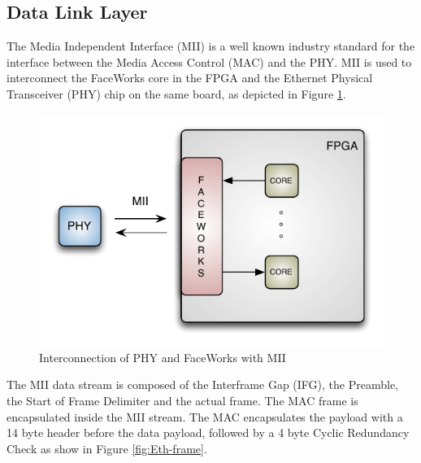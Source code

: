 \documentclass[conference]{IEEEtran}
\begin{document}
\subsection{Data Link Layer}

The Media Independent Interface (MII)\cite{ieee802.3b} is a well known industry standard for the interface between the Media Access Control (MAC)\cite{ieee802.3a} and the PHY. MII is used to interconnect the FaceWorks core in the FPGA and the Ethernet Physical Transceiver (PHY) chip on the same board, as depicted in Figure \ref{fig:MII}.

\begin{figure}[h]
  \centering
      \includegraphics[scale=0.80]{Diagrams/MII.pdf}
  \caption{Interconnection of PHY and FaceWorks with MII}\label{fig:MII}
\end{figure}
\clearpage

The MII data stream is composed of the Interframe Gap (IFG), the Preamble, the Start of Frame Delimiter and the actual frame. The MAC frame is encapsulated inside the MII stream. The MAC encapsulates the payload with a 14 byte header before the data payload, followed by a 4 byte Cyclic Redundancy Check as show in Figure \ref{fig:Eth-frame}.
\end{document}
